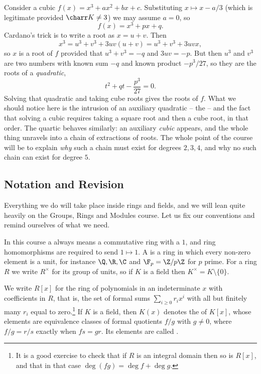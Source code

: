 Consider a cubic $f(x) = x^3 + ax^2 + bx + c$. Substituting $x \mapsto x - a/3$ (which is legitimate provided $\charr K \neq 3$) we may assume $a = 0$, so
$$f(x) = x^3 + px + q.$$
Cardano's trick is to write a root as $x = u + v$. Then
$$x^3 = u^3 + v^3 + 3uv(u+v) = u^3 + v^3 + 3uvx,$$
so $x$ is a root of $f$ provided that $u^3 + v^3 = -q$ and $3uv = -p$. But then $u^3$ and $v^3$ are two numbers with known sum $-q$ and known product $-p^3/27$, so they are the roots of a \emph{quadratic},
$$t^2 + qt - \frac{p^3}{27} = 0.$$
Solving that quadratic and taking cube roots gives the roots of $f$. What we should notice here is the intrusion of an auxiliary quadratic -- the  -- and the fact that solving a cubic requires taking a square root and then a cube root, in that order. The quartic behaves similarly: an auxiliary \emph{cubic} appears, and the whole thing unravels into a chain of extractions of roots. The whole point of the course will be to explain \emph{why} such a chain must exist for degrees $2, 3, 4$, and why no such chain can exist for degree $5$.

\subsection{Notation and Revision}

Everything we do will take place inside rings and fields, and we will lean quite heavily on the Groups, Rings and Modules course. Let us fix our conventions and remind ourselves of what we need.

In this course a  always means a commutative ring with a $1$, and ring homomorphisms are required to send $1 \mapsto 1$. A  is a ring in which every non-zero element is a unit, for instance $\Q, \R, \C$ and $\F_p = \Z/p\Z$ for $p$ prime. For a ring $R$ we write $R^\times$ for its group of units, so if $K$ is a field then $K^\times = K \setminus \{0\}$.

We write $R[x]$ for the ring of polynomials in an indeterminate $x$ with coefficients in $R$, that is, the set of formal sums $\sum_{i \geq 0} r_i x^i$ with all but finitely many $r_i$ equal to zero.\footnote{It is a good exercise to check that if $R$ is an integral domain then so is $R[x]$, and that in that case $\deg(fg) = \deg f + \deg g$.} If $K$ is a field, then $K(x)$ denotes the  of $K[x]$, whose elements are equivalence classes of formal quotients $f/g$ with $g \neq 0$, where $f/g = r/s$ exactly when $fs = gr$. Its elements are called .

